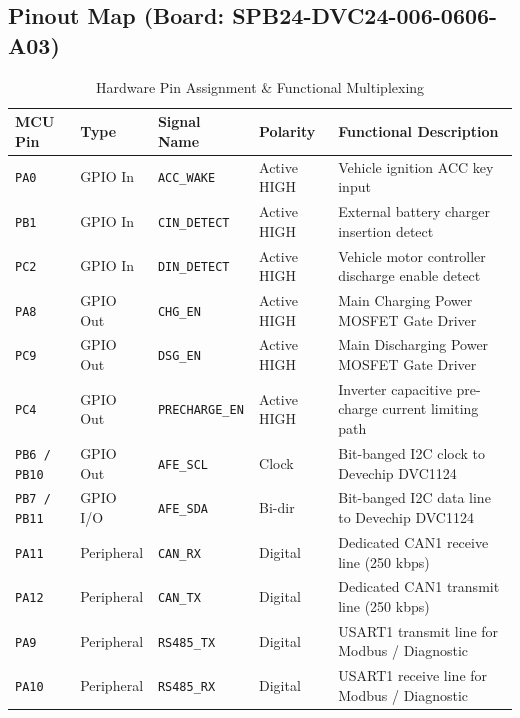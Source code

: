 \documentclass[10pt,a4paper]{article}
\begin{document}
\subsection{Pinout Map (Board: SPB24-DVC24-006-0606-A03)}
\begin{table}[htbp]
\centering
\caption{Hardware Pin Assignment \& Functional Multiplexing}
\label{tab:pinout}
\begin{tabularx}{\textwidth}{llllX}
\toprule
\textbf{MCU Pin} & \textbf{Type} & \textbf{Signal Name} & \textbf{Polarity} & \textbf{Functional Description} \\
\midrule
\texttt{PA0} & GPIO In & \texttt{ACC\_WAKE} & Active HIGH & Vehicle ignition ACC key input \\
\texttt{PB1} & GPIO In & \texttt{CIN\_DETECT} & Active HIGH & External battery charger insertion detect \\
\texttt{PC2} & GPIO In & \texttt{DIN\_DETECT} & Active HIGH & Vehicle motor controller discharge enable detect \\
\texttt{PA8} & GPIO Out & \texttt{CHG\_EN} & Active HIGH & Main Charging Power MOSFET Gate Driver \\
\texttt{PC9} & GPIO Out & \texttt{DSG\_EN} & Active HIGH & Main Discharging Power MOSFET Gate Driver \\
\texttt{PC4} & GPIO Out & \texttt{PRECHARGE\_EN} & Active HIGH & Inverter capacitive pre-charge current limiting path \\
\texttt{PB6 / PB10} & GPIO Out & \texttt{AFE\_SCL} & Clock & Bit-banged I2C clock to Devechip DVC1124 \\
\texttt{PB7 / PB11} & GPIO I/O & \texttt{AFE\_SDA} & Bi-dir & Bit-banged I2C data line to Devechip DVC1124 \\
\texttt{PA11} & Peripheral & \texttt{CAN\_RX} & Digital & Dedicated CAN1 receive line (250 kbps) \\
\texttt{PA12} & Peripheral & \texttt{CAN\_TX} & Digital & Dedicated CAN1 transmit line (250 kbps) \\
\texttt{PA9} & Peripheral & \texttt{RS485\_TX} & Digital & USART1 transmit line for Modbus / Diagnostic \\
\texttt{PA10} & Peripheral & \texttt{RS485\_RX} & Digital & USART1 receive line for Modbus / Diagnostic \\
\bottomrule
\end{tabularx}
\end{table}

\end{document}
